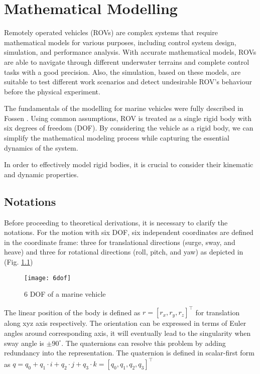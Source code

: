 \chapter{Mathematical Modelling}
\label{chap:mat}


    Remotely operated vehicles (ROVs) are complex systems that require mathematical models for various purposes, 
    including control system design, simulation, and performance analysis. With accurate mathematical models, 
    ROVs are able to navigate through different underwater terrains and complete control tasks with a good 
    precision. Also, the simulation, based on these models, are suitable to test different work scenarios and 
    detect undesirable ROV's behaviour before the physical experiment.   
    
    The fundamentals of the modelling for marine vehicles were fully described in Fossen \cite{fossen:guidance}.
    Using common assumptions, ROV is treated as a single rigid body with six degrees of freedom (DOF).
    By considering the vehicle as a rigid body, we can simplify the mathematical modeling process while capturing the essential dynamics 
    of the system.

    In order to effectively model rigid bodies, it is crucial to consider their kinematic and dynamic properties.
\section{Notations}

    Before proceeding to theoretical derivations, it is necessary to clarify the notations.
    For the motion with six DOF, six independent coordinates are defined in the coordinate frame: 
    three for translational directions (surge, sway, and heave) and three for rotational directions 
    (roll, pitch, and yaw) as depicted in (Fig. \ref{image:6dof})

    \begin{figure}[H]
        \centering\texttt{[image: 6dof]}
        \caption{6 DOF of a marine vehicle}
        \label{image:6dof}
    \end{figure}

    The linear position of the body is defined as $r = [r_x, r_y, r_z]^\top$ for translation along xyz axis respectively.
    The orientation can be expressed in terms of Euler angles around corresponding axis, it will eventually lead 
    to the singularity when sway angle is $± 90^{\circ}$. 
    The quaternions can resolve this problem by adding redundancy into the representation. 
    The quaternion is defined in scalar-first form as 
    $q = q_0 + q_1\cdot i + q_2\cdot j + q_3\cdot k = [q_0, q_1, q_2, q_3]^\top$

